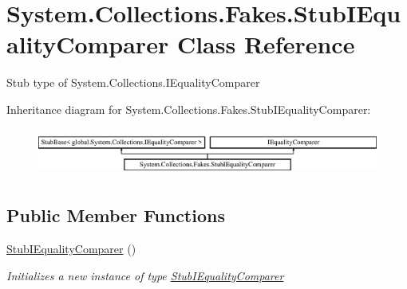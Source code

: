 \hypertarget{class_system_1_1_collections_1_1_fakes_1_1_stub_i_equality_comparer}{\section{System.\-Collections.\-Fakes.\-Stub\-I\-Equality\-Comparer Class Reference}
\label{class_system_1_1_collections_1_1_fakes_1_1_stub_i_equality_comparer}
}


Stub type of System.\-Collections.\-I\-Equality\-Comparer 


Inheritance diagram for System.\-Collections.\-Fakes.\-Stub\-I\-Equality\-Comparer\-:\begin{figure}[H]
\begin{center}
\leavevmode
\includegraphics[height=1.609195cm]{class_system_1_1_collections_1_1_fakes_1_1_stub_i_equality_comparer}
\end{center}
\end{figure}
\subsection*{Public Member Functions}
\begin{DoxyCompactItemize}
\item 
\hyperlink{class_system_1_1_collections_1_1_fakes_1_1_stub_i_equality_comparer_aa94c97ffdf9615560eeee29963d00801}{Stub\-I\-Equality\-Comparer} ()
\begin{DoxyCompactList}\small\item\em Initializes a new instance of type \hyperlink{class_system_1_1_collections_1_1_fakes_1_1_stub_i_equality_comparer}{Stub\-I\-Equality\-Comparer}\end{DoxyCompactList}\end{DoxyCompactItemize}
